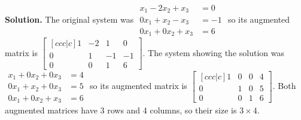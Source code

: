 \documentclass[11pt, letterpaper]{report}
\newenvironment{notes}{}{}
\newenvironment{book}{}{}
\begin{document}
\begin{book} \textbf{Solution.} The original system was 
$\begin{aligned}
x_1 - 2x_2 + x_3 &= 0 \\
0x_1+ x_2 - x_3 &= -1 \\
0x_1+0x_2+x_3 &= 6
\end{aligned}$ so its augmented matrix is $\begin{bmatrix}[ccc|c]
1 & -2 & 1 & 0\\
0 & 1 & -1 & -1 \\
0 & 0 & 1 & 6
\end{bmatrix}$. 
The system showing the solution was $\begin{aligned}
x_1 + 0x_2 + 0x_3 &= 4 \\
0x_1+ x_2 + 0x_3 &= 5 \\
0x_1+0x_2+x_3 &= 6
\end{aligned}$ so its augmented matrix is $\begin{bmatrix}[ccc|c]
1 & 0 & 0 & 4\\
0 & 1 & 0 & 5 \\
0 & 0 & 1 & 6
\end{bmatrix}$. Both augmented matrices have 3 rows and 4 columns, so their size is $3\times 4$. \blacksquare
\end{book}

\begin{notes}
\end{notes}
\end{document}
